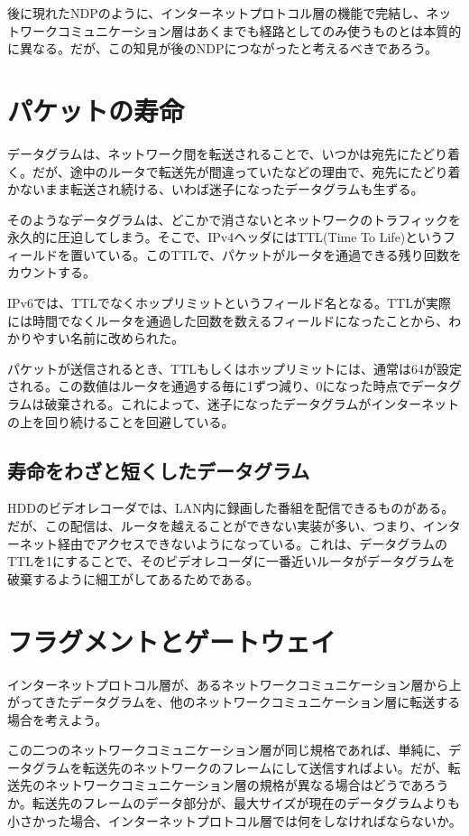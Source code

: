 後に現れたNDPのように、インターネットプロトコル層の機能で完結し、ネットワークコミュニケーション層はあくまでも経路としてのみ使うものとは本質的に異なる。だが、この知見が後のNDPにつながったと考えるべきであろう。


\section{パケットの寿命}

データグラムは、ネットワーク間を転送されることで、いつかは宛先にたどり着く。だが、途中のルータで転送先が間違っていたなどの理由で、宛先にたどり着かないまま転送され続ける、いわば迷子になったデータグラムも生ずる。

そのようなデータグラムは、どこかで消さないとネットワークのトラフィックを永久的に圧迫してしまう。そこで、IPv4ヘッダにはTTL(Time To Life)というフィールドを置いている。このTTLで、パケットがルータを通過できる残り回数をカウントする。

IPv6では、TTLでなくホップリミットというフィールド名となる。TTLが実際には時間でなくルータを通過した回数を数えるフィールドになったことから、わかりやすい名前に改められた。

パケットが送信されるとき、TTLもしくはホップリミットには、通常は64が設定される。この数値はルータを通過する毎に1ずつ減り、0になった時点でデータグラムは破棄される。これによって、迷子になったデータグラムがインターネットの上を回り続けることを回避している。

\subsection{寿命をわざと短くしたデータグラム}

HDDのビデオレコーダでは、LAN内に録画した番組を配信できるものがある。だが、この配信は、ルータを越えることができない実装が多い、つまり、インターネット経由でアクセスできないようになっている。これは、データグラムのTTLを1にすることで、そのビデオレコーダに一番近いルータがデータグラムを破棄するように細工がしてあるためである。

\section{フラグメントとゲートウェイ}

インターネットプロトコル層が、あるネットワークコミュニケーション層から上がってきたデータグラムを、他のネットワークコミュニケーション層に転送する場合を考えよう。

この二つのネットワークコミュニケーション層が同じ規格であれば、単純に、データグラムを転送先のネットワークのフレームにして送信すればよい。だが、転送先のネットワークコミュニケーション層の規格が異なる場合はどうであろうか。転送先のフレームのデータ部分が、最大サイズが現在のデータグラムよりも小さかった場合、インターネットプロトコル層では何をしなければならないか。

